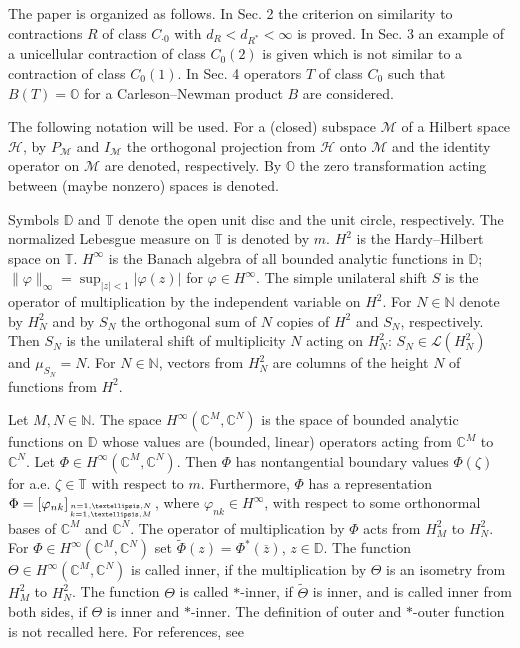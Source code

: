 \documentclass[a4paper,oneside,11pt]{amsart}
\numberwithin{equation}{section}
\theoremstyle{plain}
\theoremstyle{definition}
\begin{document}
The paper is organized as follows. In Sec. 2 the criterion on similarity to contractions  $R$ of class  $C_{\cdot 0}$ with $d_R<d_{R^*}<\infty$ 
is proved. In Sec. 3 an example of a unicellular contraction of class $C_0(2)$ is given which is not similar to a contraction of class $C_0(1)$. 
In Sec. 4 operators $T$ of class $C_0$ such that $B(T)=\mathbb O$ for  a Carleson--Newman product $B$ are considered. 

 The following notation will be used. For a (closed) subspace $\mathcal M$ of a Hilbert space $\mathcal H$, by 
$P_{\mathcal M}$ and $I_{\mathcal M}$ the orthogonal projection from $\mathcal H$ onto $\mathcal M$ and 
 the identity operator on $\mathcal M$ are denoted,  respectively. 
By $\mathbb O$ the zero transformation acting between (maybe nonzero) spaces is denoted.

Symbols $\mathbb D$ and $\mathbb T$ denote the open unit disc
and the unit circle, respectively. The normalized Lebesgue measure on $\mathbb T$ is denoted by $m$. 
$H^2$ is  the Hardy--Hilbert space on $\mathbb T$. $H^\infty$ is the  
 Banach algebra of all bounded analytic functions  in $\mathbb D$; 
 $\|\varphi\|_\infty=\sup_{|z|< 1}|\varphi(z)|$ for $\varphi\in H^\infty$. 
The simple unilateral shift  $S$ is the operator  of multiplication by the independent variable    on $H^2$. 
For $N\in\mathbb N$ denote by  $H^2_N$ and by $S_N$   the orthogonal sum of $N$ copies of $H^2$ and $S_N$,  respectively. 
Then $S_N$ is the unilateral shift of multiplicity $N$ acting on $H^2_N$: $S_N\in\mathcal L(H^2_N)$ and $\mu_{S_N}=N$.  
For $N\in\mathbb N$, vectors from $H^2_N$ are columns of the height $N$ of functions from $H^2$. 

Let $M,N\in\mathbb N$. 
The space $H^\infty(\mathbb C^M,\mathbb C^N)$ is the space of bounded analytic functions on $\mathbb D$ 
whose values are (bounded, linear) operators acting from $\mathbb  C^M$ to $\mathbb C^N$. 
Let $\Phi\in H^\infty(\mathbb C^M,\mathbb C^N)$. Then $\Phi$ has nontangential boundary values 
$\Phi(\zeta)$ for a.e. $\zeta\in\mathbb T$ with respect to  $m$. 
Furthermore, $\Phi$ has 
a representation $\Phi=[\varphi_{nk}]_{n=1,\ldots, N\atop k=1, \ldots,M}$, where $\varphi_{nk}\in H^\infty$,
with respect to some  orthonormal bases of $\mathbb C^M$ and $\mathbb C^N$. The operator of multiplication by $\Phi$ 
acts from $H^2_M$ to $H^2_N$. For $\Phi\in H^\infty(\mathbb C^M,\mathbb C^N)$ set 
$\widetilde\Phi(z)=\Phi^*(\overline z)$, $z\in\mathbb D$. 
The function  $\Theta\in H^\infty(\mathbb C^M,\mathbb C^N)$ is called inner, if 
the multiplication by $\Theta$ is an isometry from $H^2_M$ to $H^2_N$. The function $\Theta$ is called $*$-inner, 
if $\widetilde\Theta$ is inner, and is called  inner from both sides, if $\Theta$ is inner and $*$-inner. The definition of 
outer and $*$-outer function is not recalled here. For references, see {\cite[Sec. V.2.3]{sznfbk}}
\end{document}

